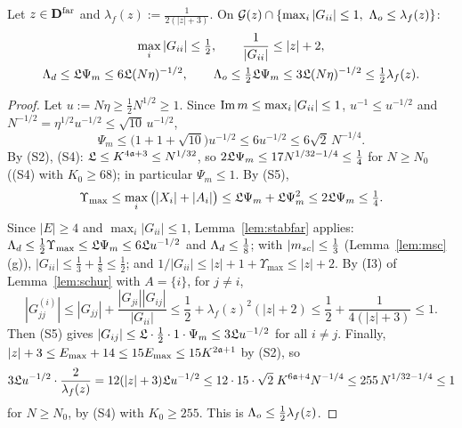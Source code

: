 \begin{lemma}\label{lem:farstep}
Let $z\in\mathbf{D}^{\rm far}$ and $\lambda_f(z):=\frac1{2(|z|+3)}$. On $\cG(z)\cap\{\max_i|G_{ii}|\le1,\ \Lo\le\lambda_f(z)\}$:
\begin{gather*}
 \max_i|G_{ii}|\le\tfrac12,\qquad\frac1{|G_{ii}|}\le|z|+2,\\
 \Lambda_d\le\mathfrak{L}\Psi_m\le6\mathfrak{L}(N\eta)^{-1/2},\qquad\Lambda_o\le\tfrac12\mathfrak{L}\Psi_m\le3\mathfrak{L}(N\eta)^{-1/2}\le\tfrac12\lambda_f(z).
\end{gather*}
\end{lemma}
\begin{proof}
Let $u:=N\eta\ge\frac12N^{1/2}\ge1$. Since $\operatorname{Im} m\le\max_i|G_{ii}|\le1$, $u^{-1}\le u^{-1/2}$ and $N^{-1/2}=\eta^{1/2}u^{-1/2}\le\sqrt{10}\,u^{-1/2}$,
\[
 \Psi_m\le\big(1+1+\sqrt{10}\big)u^{-1/2}\le6u^{-1/2}\le6\sqrt2\,N^{-1/4}.
\]
By (S2), (S4): $\mathfrak{L}\le K^{4\mathfrak{a}+3}\le N^{1/32}$, so $2\mathfrak{L}\Psi_m\le17N^{1/32-1/4}\le\frac14$ for $N\ge N_0$ ((S4) with $K_0\ge68$); in particular $\Psi_m\le1$. By (S5),
\[
 \Upsilon_{\max}\le\max_i\big(|X_i|+|A_i|\big)\le\mathfrak{L}\Psi_m+\mathfrak{L}\Psi_m^2\le2\mathfrak{L}\Psi_m\le\tfrac14 .
\]
Since $|E|\ge4$ and $\max_i|G_{ii}|\le1$, Lemma~\ref{lem:stabfar} applies: $\Lambda_d\le\frac12\Upsilon_{\max}\le\mathfrak{L}\Psi_m\le6\mathfrak{L} u^{-1/2}$ and $\Lambda_d\le\frac18$; with $|m_{sc}|\le\frac13$ (Lemma~\ref{lem:msc}(g)), $|G_{ii}|\le\frac13+\frac18\le\frac12$; and
$1/|G_{ii}|\le|z|+1+\Upsilon_{\max}\le|z|+2$. By (I3) of Lemma~\ref{lem:schur} with $A=\{i\}$, for $j\ne i$,
\[
 |G^{(i)}_{jj}|\le|G_{jj}|+\frac{|G_{ji}||G_{ij}|}{|G_{ii}|}\le\frac12+\lambda_f(z)^2(|z|+2)\le\frac12+\frac1{4(|z|+3)}\le1 .
\]
Then (S5) gives $|G_{ij}|\le\mathfrak{L}\cdot\frac12\cdot1\cdot\Psi_m\le3\mathfrak{L} u^{-1/2}$ for all $i\ne j$. Finally, $|z|+3\le E_{\max}+14\le15E_{\max}\le15K^{2\mathfrak{a}+1}$ by (S2), so
\[
 3\mathfrak{L} u^{-1/2}\cdot\frac2{\lambda_f(z)}=12(|z|+3)\mathfrak{L} u^{-1/2}\le12\cdot15\cdot\sqrt2\;K^{6\mathfrak{a}+4}N^{-1/4}\le255\,N^{1/32-1/4}\le1
\]
for $N\ge N_0$, by (S4) with $K_0\ge255$. This is $\Lambda_o\le\frac12\lambda_f(z)$.
\end{proof}
